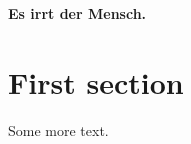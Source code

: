 \documentclass{article}
\begin{document}
\textbf{Es irrt der Mensch.}

\section{First section}

Some more text.
\end{document}
